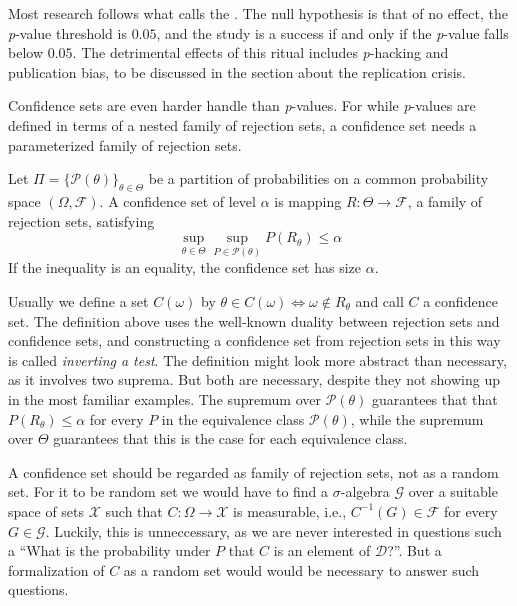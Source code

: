Most research follows what \textcite{Gigerenzer2004-oc} calls the . The null hypothesis is that of no effect, the \textit{p}-value threshold is $0.05$, and the study is a success if and only if the \textit{p}-value falls below $0.05$. The detrimental effects of this ritual includes \textit{p}-hacking and publication bias, to be discussed in the section about the replication crisis.

Confidence sets are even harder handle than \emph{p}-values. For while
\emph{p}-values are defined in terms of a nested family of rejection
sets, a confidence set needs a parameterized family of rejection sets.
\begin{definition}
\label{def:confidence sets}Let $\Pi=\{\mathcal{P}(\theta)\}_{\theta\in\Theta}$
be a partition of probabilities on a common probability space $(\Omega,\mathcal{F})$.
A confidence set of level $\alpha$ is mapping $R:\Theta\to\mathcal{F}$,
a family of rejection sets, satisfying 
\begin{equation}
\sup_{\theta\in\Theta}\sup_{P\in\mathcal{P}(\theta)}P(R_{\theta})\leq\alpha\label{eq:confidence set}
\end{equation}
If the inequality is an equality, the confidence set has size $\alpha$. 
\end{definition}

Usually we define a set $C(\omega)$ by $\theta\in C(\omega)\iff\omega\notin R_{\theta}$ and call $C$ a confidence set. The definition above uses the well-known duality between rejection sets and confidence sets, and constructing a confidence set from rejection sets in this way is called
\emph{inverting a test}. The definition might look more abstract than necessary, as it involves two suprema. But both are necessary, despite they not showing up in the most familiar examples. The supremum over $\mathcal{P}(\theta)$ guarantees that that $P(R_{\theta})\leq\alpha$
for every $P$ in the equivalence class $\mathcal{P}(\theta)$, while
the supremum over $\Theta$ guarantees that this is the case for each equivalence class.

A confidence set should be regarded as family of rejection sets, not as a random set. For it to be random set we would have to find a $\sigma$-algebra $\mathcal{G}$ over a suitable space of sets $\mathcal{X}$ such that $C:\Omega\to\mathcal{X}$ is measurable, i.e., $C^{-1}(G)\in\mathcal{F}$ for every $G\in\mathcal{G}$. Luckily, this is unneccessary, as we are never interested in questions such a ``What is the probability under $P$ that $C$ is an element of $\mathcal{D}$?''. But a formalization of $C$ as a random set would would be necessary to answer such questions.

